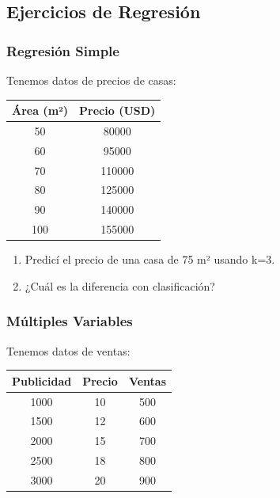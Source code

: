 \documentclass[12pt]{article}
\begin{document}
\subsection{Ejercicios de Regresión}

\subsubsection{Regresión Simple}

Tenemos datos de precios de casas:

\begin{table}[H]
    \centering
    \begin{tabular}{cc}
        \toprule
        \textbf{Área (m²)} & \textbf{Precio (USD)} \\
        \midrule
        50 & 80000 \\
        60 & 95000 \\
        70 & 110000 \\
        80 & 125000 \\
        90 & 140000 \\
        100 & 155000 \\
        \bottomrule
    \end{tabular}
\end{table}

\begin{enumerate}
    \item Predicí el precio de una casa de 75 m² usando k=3.
    \item ¿Cuál es la diferencia con clasificación?
\end{enumerate}

\subsubsection{Múltiples Variables}

Tenemos datos de ventas:

\begin{table}[H]
    \centering
    \begin{tabular}{ccc}
        \toprule
        \textbf{Publicidad} & \textbf{Precio} & \textbf{Ventas} \\
        \midrule
        1000 & 10 & 500 \\
        1500 & 12 & 600 \\
        2000 & 15 & 700 \\
        2500 & 18 & 800 \\
        3000 & 20 & 900 \\
        \bottomrule
    \end{tabular}
\end{table}
\end{document}
